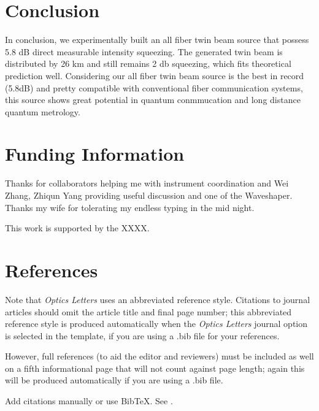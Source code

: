 \documentclass[9pt,twocolumn,twoside]{osajnl}
\begin{document}
\section{Conclusion}
In conclusion, we experimentally built an all fiber twin beam source that possess 5.8 dB direct measurable intensity squeezing.
The generated twin beam is distributed by 26 km and still remains 2 db squeezing, which fits theoretical prediction well. Considering our all fiber twin beam source is the best in record (5.8dB) and pretty compatible with conventional fiber communication systems, this source shows great potential in quantum conmmucation and long distance quantum metrology.


\section{Funding Information}
Thanks for collaborators helping me with instrument coordination and Wei Zhang, Zhiqun Yang providing useful discussion and one of the Waveshaper. Thanks my wife for tolerating my endless typing in the mid night.

This work is supported by the XXXX.


\section{References}

Note that \emph{Optics Letters} uses an abbreviated reference style. Citations to journal articles should omit the article title and final page number; this abbreviated reference style is produced automatically when the \emph{Optics Letters} journal option is selected in the template, if you are using a .bib file for your references.

However, full references (to aid the editor and reviewers) must be included as well on a fifth informational page that will not count against page length; again this will be produced automatically if you are using a .bib file.

\bigskip
\noindent Add citations manually or use BibTeX. See \cite{Zhang:14,OSA,FORSTER2007,testthesis,guo12}.



\end{document}
